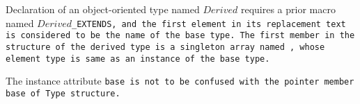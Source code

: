 Declaration of an object-oriented type named $Derived$ requires a
prior macro named $Derived$\tt{_EXTENDS}, and the first element in
its replacement text is considered to be the name of the base type.
The first member in the structure of the derived type is a singleton array
named , whose element type is same as an instance of the base type.

\note The instance attribute \tt{base} is not to be confused
with the pointer member \tt{base} of \tt{Type} structure.
